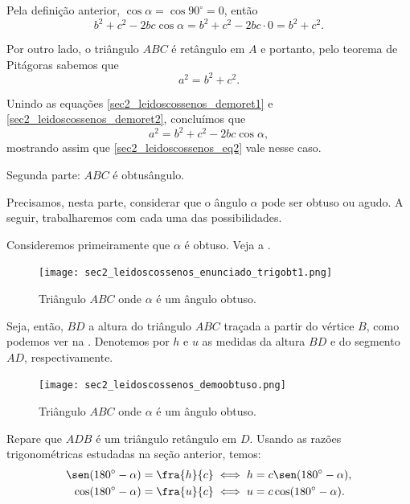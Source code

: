 Pela definição anterior, $\cos \alpha = \cos 90^\circ=0$, então 
\begin{equation}\label{sec2_leidoscossenos_demoret1}
b^2+c^2-2bc\cos\alpha= b^2+c^2-2bc \cdot 0 = b^2+c^2.
\end{equation}

Por outro lado, o triângulo $ABC$ é retângulo em $A$ e portanto, pelo teorema de Pitágoras sabemos que
\begin{equation}\label{sec2_leidoscossenos_demoret2}
a^2=b^2+c^2.
\end{equation}

\no Unindo as equações \eqref{sec2_leidoscossenos_demoret1} e \eqref{sec2_leidoscossenos_demoret2}, concluímos que
$$a^2=b^2+c^2-2bc\cos\alpha,$$
mostrando assim que \eqref{sec2_leidoscossenos_eq2} vale nesse caso.

\vspace{0.5cm}

Segunda parte: $ABC$ é obtusângulo.

Precisamos, nesta parte, considerar que o ângulo $\alpha$ pode ser obtuso ou agudo. A seguir, trabalharemos com cada uma das possibilidades.

Consideremos primeiramente que $\alpha$ é obtuso. Veja a .

\begin{figure}[H]
    \centering
    \texttt{[image: sec2\_leidoscossenos\_enunciado\_trigobt1.png]}
    \caption{Triângulo $ABC$ onde $\alpha$ é um ângulo obtuso.}
    \label{sec2_leidoscossenos_fig_demo_obtusangulo_obtuso1}
\end{figure}

Seja, então, $BD$ a altura do triângulo $ABC$ traçada a partir do vértice $B$, como podemos ver na . Denotemos por $h$ e $u$ as medidas da altura $BD$ e do segmento $AD$, respectivamente.

\begin{figure}[H]
    \centering
    \texttt{[image: sec2\_leidoscossenos\_demoobtuso.png]}
    \caption{Triângulo $ABC$ onde $\alpha$ é um ângulo obtuso.}
    \label{sec2_leidoscossenos_fig_demo_obtusangulo_obtuso2}
\end{figure}

Repare que $ADB$ é um triângulo retângulo em $D$. Usando as razões trigonométricas estudadas na seção anterior, temos:
\begin{eqnarray}{}
 \sen (180^\circ-\alpha) = \fra{h}{c} & \iff h=c\sen (180^\circ-\alpha), \label{sec2_leidoscossenos_demo8}\\ 
 \cos (180^\circ-\alpha) = \fra{u}{c} & \iff u=c\cos (180^\circ-\alpha). \label{sec2_leidoscossenos_demo9}
\end{eqnarray}


